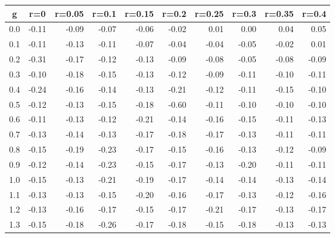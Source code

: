 %
\begin{table}[!tbp]
 \begin{center}
 \begin{tabular}{rrrrrrrrrr}\hline\hline
\multicolumn{1}{c}{g}&\multicolumn{1}{c}{r=0}&\multicolumn{1}{c}{r=0.05}&\multicolumn{1}{c}{r=0.1}&\multicolumn{1}{c}{r=0.15}&\multicolumn{1}{c}{r=0.2}&\multicolumn{1}{c}{r=0.25}&\multicolumn{1}{c}{r=0.3}&\multicolumn{1}{c}{r=0.35}&\multicolumn{1}{c}{r=0.4}\tabularnewline
\hline
0.0&-0.11&-0.09&-0.07&-0.06&-0.02& 0.01& 0.00& 0.04& 0.05\tabularnewline
0.1&-0.11&-0.13&-0.11&-0.07&-0.04&-0.04&-0.05&-0.02& 0.01\tabularnewline
0.2&-0.31&-0.17&-0.12&-0.13&-0.09&-0.08&-0.05&-0.08&-0.09\tabularnewline
0.3&-0.10&-0.18&-0.15&-0.13&-0.12&-0.09&-0.11&-0.10&-0.11\tabularnewline
0.4&-0.24&-0.16&-0.14&-0.13&-0.21&-0.12&-0.11&-0.15&-0.10\tabularnewline
0.5&-0.12&-0.13&-0.15&-0.18&-0.60&-0.11&-0.10&-0.10&-0.10\tabularnewline
0.6&-0.11&-0.13&-0.12&-0.21&-0.14&-0.16&-0.15&-0.11&-0.13\tabularnewline
0.7&-0.13&-0.14&-0.13&-0.17&-0.18&-0.17&-0.13&-0.11&-0.11\tabularnewline
0.8&-0.15&-0.19&-0.23&-0.17&-0.15&-0.16&-0.13&-0.12&-0.09\tabularnewline
0.9&-0.12&-0.14&-0.23&-0.15&-0.17&-0.13&-0.20&-0.11&-0.11\tabularnewline
1.0&-0.15&-0.13&-0.21&-0.19&-0.17&-0.14&-0.14&-0.13&-0.14\tabularnewline
1.1&-0.13&-0.13&-0.15&-0.20&-0.16&-0.17&-0.13&-0.12&-0.16\tabularnewline
1.2&-0.13&-0.16&-0.17&-0.15&-0.17&-0.21&-0.17&-0.13&-0.17\tabularnewline
1.3&-0.15&-0.18&-0.26&-0.17&-0.18&-0.15&-0.18&-0.13&-0.13\tabularnewline
\hline
\end{tabular}

\end{center}

\end{table}

